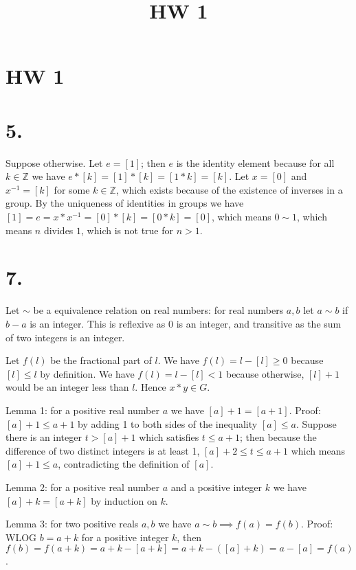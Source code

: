 \documentclass{article}
\title{HW 1}
\date{}
\def\Z{\mathbb{Z}}
\begin{document}
\maketitle

\section*{HW 1}

\section*{5.}

Suppose otherwise. Let $e = [1]$; then $e$ is the identity element because for all $k \in \Z$ we have $e*[k] = [1]*[k] = [1*k] = [k]$. Let $x=[0]$ and $x^{-1}=[k]$ for some $k \in \Z$, which exists because of the existence of inverses in a group. By the uniqueness of identities in groups we have $[1] = e = x*x^{-1} = [0]*[k] = [0*k] = [0]$, which means $0 \sim 1$, which means $n$ divides $1$, which is not true for $n>1$.

\section*{7.}

Let $\sim$ be a equivalence relation on real numbers: for real numbers $a, b$ let $a \sim b$ if $b - a$ is an integer. This is reflexive as $0$ is an integer, and transitive as the sum of two integers is an integer.

Let $f(l)$ be the fractional part of $l$. We have $f(l) = l - [l] \ge 0$ because $[l] \le l$ by definition. We have $f(l) = l - [l] < 1$ because otherwise, $[l]+1$ would be an integer less than $l$. Hence $x * y \in G$.

Lemma 1: for a positive real number $a$ we have $[a]+1 = [a+1]$. Proof: $[a]+1 \le a+1$ by adding 1 to both sides of the inequality $[a] \le a$. Suppose there is an integer $t > [a]+1$ which satisfies $t \le a+1$; then because the difference of two distinct integers is at least 1, $[a]+2 \le t \le a+1$ which means $[a] + 1 \le a$, contradicting the definition of $[a]$.

Lemma 2: for a positive real number $a$ and a positive integer $k$ we have $[a]+k = [a+k]$ by induction on $k$.

Lemma 3: for two positive reals $a, b$ we have $a \sim b \implies f(a) = f(b)$. Proof: WLOG $b = a+k$ for a positive integer $k$, then $f(b) = f(a+k) = a+k - [a+k] = a+k - ([a] + k) = a - [a] = f(a)$.
\end{document}
